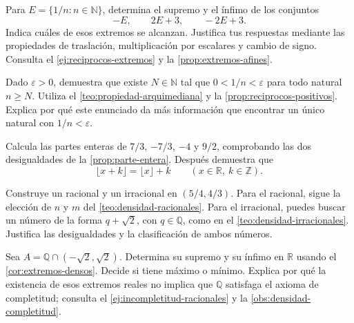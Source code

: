 \begin{samepage}
\begin{problem}
Para $E=\{1/n:n\in\mathbb{N}\}$, determina el supremo y el ínfimo de los conjuntos
\[
 -E,\qquad 2E+3,\qquad -2E+3.
\]
Indica cuáles de esos extremos se alcanzan. Justifica tus respuestas mediante las propiedades de traslación, multiplicación por escalares y cambio de signo.
Consulta el \cref{ej:reciprocos-extremos} y la \cref{prop:extremos-afines}.
\end{problem}
\end{samepage}
\par{}

\begin{samepage}
\begin{problem}
Dado $\varepsilon>0$, demuestra que existe $N\in\mathbb{N}$ tal que $0<1/n<\varepsilon$ para todo natural $n\geq N$. Utiliza el \cref{teo:propiedad-arquimediana} y la \cref{prop:reciprocos-positivos}. Explica por qué este enunciado da más información que encontrar un único natural con $1/n<\varepsilon$.
\end{problem}
\end{samepage}
\par{}

\begin{samepage}
\begin{problem}
Calcula las partes enteras de $7/3$, $-7/3$, $-4$ y $9/2$, comprobando las dos desigualdades de la \cref{prop:parte-entera}. Después demuestra que
\[
\lfloor x+k\rfloor=\lfloor x\rfloor+k
\qquad(x\in\mathbb{R},\ k\in\mathbb{Z}).
\]
\end{problem}
\end{samepage}
\par{}

\begin{samepage}
\begin{problem}
Construye un racional y un irracional en $(5/4,4/3)$. Para el racional, sigue la elección de $n$ y $m$ del \cref{teo:densidad-racionales}. Para el irracional, puedes buscar un número de la forma $q+\sqrt2$, con $q\in\mathbb{Q}$, como en el \cref{teo:densidad-irracionales}. Justifica las desigualdades y la clasificación de ambos números.
\end{problem}
\end{samepage}
\par{}

\begin{samepage}
\begin{problem}
Sea $A=\mathbb{Q}\cap(-\sqrt2,\sqrt2)$. Determina su supremo y su ínfimo en $\mathbb{R}$ usando el \cref{cor:extremos-densos}. Decide si tiene máximo o mínimo. Explica por qué la existencia de esos extremos reales no implica que $\mathbb{Q}$ satisfaga el axioma de completitud; consulta el \cref{ej:incompletitud-racionales} y la \cref{obs:densidad-completitud}.
\end{problem}
\end{samepage}
\par{}



